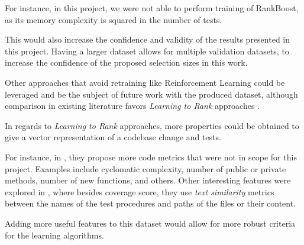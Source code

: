 For instance, in this project, we were not able
to perform training of RankBoost, as its memory complexity is squared in the
number of tests.

This would also increase the confidence and validity of the results presented in this 
project. Having a larger dataset allows for multiple validation datasets, to increase the
confidence of the proposed selection sizes in this work.

Other approaches that avoid retraining like Reinforcement Learning could be 
leveraged and be the subject of future work with the produced dataset, although
comparison in existing literature favors \emph{Learning to Rank} approaches \cite{Bertolino2020LearningtoRankVR}.

In regards to \emph{Learning to Rank} approaches, more properties could be
obtained to give a vector representation of a codebase change and tests. 

For instance, in \cite{Bertolino2020LearningtoRankVR}, they propose more 
code metrics that were not in scope for this project. Examples include 
cyclomatic complexity, number of public or private methods, number of 
new functions, and others. Other interesting features were explored in \cite{Busjaeger2016LearningFT}, 
where besides coverage score, they use \emph{text similarity} metrics between the 
names of the test procedures and paths of the files or their content. 

Adding more useful features to this dataset would allow for more
robust criteria for the learning algorithms.